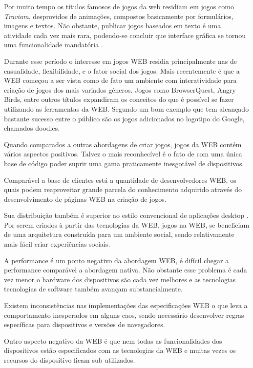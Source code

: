 Por muito tempo os títulos famosos de jogos da web residiam em jogos
como \textit{Traviam}, desprovidos de animações, compostos basicamente
por formulários, imagens e textos. Não obstante, publicar jogos
baseados em texto é uma atividade cada vez mais rara, podendo-se
concluir que interface gráfica se tornou uma funcionalidade mandatória
\autocite{browserGamesTechnologyAndFuture}.

Durante esse período o interesse em jogos WEB residia principalmente
nas de casualidade, flexibilidade, e o fator social dos jogos.
Mais recentemente é que a WEB começou a ser vista como de fato um
ambiente com interatividade para criação de jogos dos mais variados
gêneros. Jogos como BrowserQuest, Angry Birds, entre outros
títulos expandiram os conceitos do que é possível se fazer utilizando
as ferramentas da WEB. Segundo \cite[pp. 28]{gwt} um bom exemplo
que tem alcançado bastante sucesso entre o público são os jogos
adicionados no logotipo do Google, chamados doodles.

Quando comparados a outras abordagens de criar jogos, jogos da WEB
contém vários aspectos positivos. Talvez o mais reconhecível
é o fato de com uma única base de código poder suprir uma gama
praticamente inesgotável de dispositivos. 

Comparável a base de clientes está a quantidade de desenvolvedores
WEB, os quais podem reaproveitar grande parcela do conhecimento
adquirido através do desenvolvimento de páginas WEB na criação de
jogos.

Sua distribuição também é superior ao estilo convencional de
aplicações desktop \autocite{browserGamesTechnologyAndFuture}. 
Por serem criados à partir das tecnologias da WEB, jogos na WEB, se
beneficiam de uma arquitetura construída para um ambiente social, sendo
relativamente mais fácil criar experiências sociais.

A performance é um ponto negativo da abordagem WEB, é difícil
chegar a performance comparável a abordagem nativa. Não obstante
esse problema é cada vez menor o hardware dos dispositivos são cada
vez melhores e as tecnologias tecnologias de software também avançam
substancialmente.

Existem inconsistências nas implementações das especificações
WEB o que leva a comportamento inesperados em alguns caos, sendo
necessário desenvolver regras específicas para dispositivos e versões
de navegadores.

Outro aspecto negativo da WEB é que nem todas as funcionalidades dos
dispositivos estão especificados com as tecnologias da WEB e muitas
vezes os recursos do dispositivo ficam sub utilizados.

